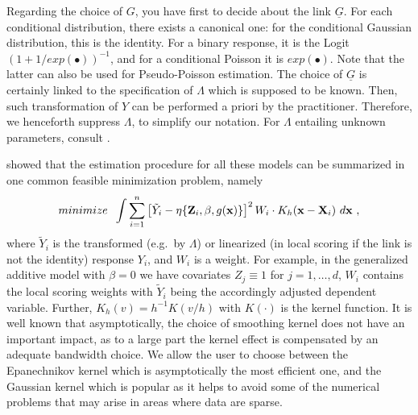 Regarding the choice of $G$, you have first to decide about the link $\underline{G}$. For each conditional distribution, there exists a canonical one: for the conditional Gaussian distribution, this is the identity. 
For a binary response, it is the Logit $({1+1/exp( \bullet )})^{-1}$, and for a
conditional Poisson it is $exp(\bullet )$. Note that the latter can also be used for Pseudo-Poisson estimation. The choice of $\underline{G}$ is certainly linked to the specification of $\Lambda$ which is supposed to be known. Then, such transformation of $Y$ can be performed a priori by the practitioner. Therefore, we henceforth suppress $\Lambda$, to simplify our notation. For $\Lambda$ entailing unknown parameters, consult \cite{LSVK2008}.
	
\citet{RS2010} showed that the estimation procedure for all these models can be summarized in one common feasible minimization problem, namely
\begin{equation} \label{proj-ideaW}
minimize \;\; \int \sum_{i=1}^n \left[ \tilde Y_i - \eta \{{\mathbf Z}_i ,\beta ,g({\mathbf x}) \} \right]^2 W_i \cdot K_h ({{\mathbf x}-{\mathbf X}_i}) \ d{\bf x} \ ,
\end{equation}
where $\tilde Y_i$ is the transformed (e.g.\ by $\Lambda$) 
or linearized (in local scoring if the link is not the identity) response $Y_i$, and $W_i$ is a weight. For example, in the generalized additive model with $\beta = 0$ we have covariates $Z_j \equiv 1$ for $j=1,\ldots, d$, $W_i$ contains the local scoring weights with $\tilde Y_i$ being the accordingly adjusted dependent variable. Further, $K_h(v) = h^{-1} K(v/h)$ with $K(\cdot )$ is the kernel function. It is well known that asymptotically, the choice of smoothing kernel does not have an important impact, as to a large part the kernel effect is compensated by an adequate bandwidth choice. We allow the user to choose between the Epanechnikov kernel which is asymptotically the most efficient one, and the Gaussian kernel which is popular as it helps to avoid some of the numerical problems that may arise in areas where data are sparse.

